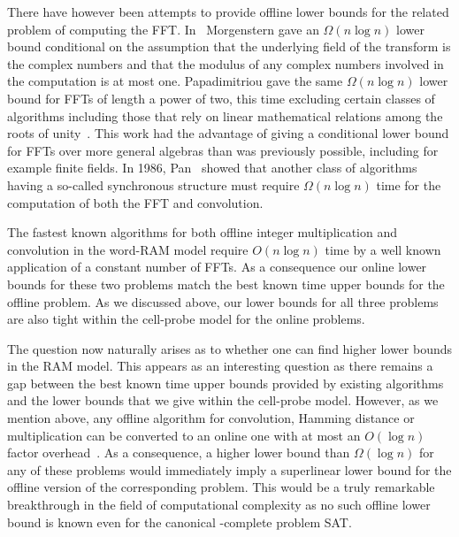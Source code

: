 \documentclass{toc}
\begin{document}
There have however been attempts to provide offline lower bounds for the related problem of computing the FFT\@.  In~\cite{Morgenstern:1973} Morgenstern gave an $\Omega(n \log{n})$ lower bound conditional on the assumption that the underlying field of the transform is the complex numbers and that the modulus of any complex numbers involved in the computation is at most one.  Papadimitriou gave the same $\Omega(n \log{n})$ lower bound for FFTs of length a power of two, this time excluding certain classes of algorithms including those that rely on linear mathematical relations among the roots of unity~\cite{Papadimitriou:1979}.  This work had the advantage of giving a conditional lower bound for FFTs over more general algebras than was previously possible, including for example finite fields.  In 1986, Pan~\cite{Pan:1986} showed that another class of algorithms having a so-called synchronous structure must require $\Omega(n \log{n})$ time for the computation of both the FFT and convolution.

The fastest known algorithms for both offline integer multiplication and convolution in the word-RAM model require $O(n\log{n})$ time by a well known application of a constant number of FFTs.  As a consequence our online lower bounds for these two problems match the best known time upper bounds for the offline problem. As we discussed above, our lower bounds for all three problems are also tight within the cell-probe model for the online problems.   

The question now naturally arises as to whether one can find higher lower bounds in the RAM model.   This appears as an interesting question as there remains a gap between the best known time upper bounds provided by existing algorithms and the lower bounds that we give within the cell-probe model.  However, as we mention above, any offline algorithm for convolution, Hamming distance or multiplication can be converted to an online one with at most an $O(\log{n})$ factor overhead~\cite{FS:1973,CEPP:2011}.
As a consequence, a higher lower bound than $\Omega(\log{n})$ for any of these problems would immediately imply a superlinear lower bound for the offline version of the corresponding problem. This would be a truly remarkable breakthrough in the field of computational complexity as no such offline lower bound is known even for the canonical -complete problem SAT.
\end{document}
